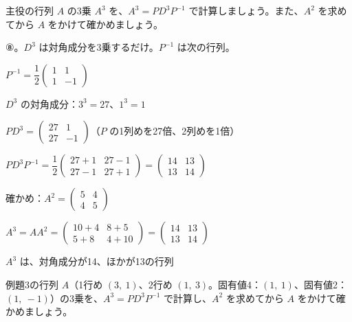 \begin{reidai}[$A^n$ を対角化で計算する]
主役の行列 $A$ の3乗 $A^3$ を、$A^3=PD^3P^{-1}$ で計算しましょう。また、$A^2$ を求めてから $A$ をかけて確かめましょう。\par
\kangaekata ⑧。$D^3$ は対角成分を3乗するだけ。$P^{-1}$ は次の行列。\par
\kviija $P^{-1}=\dfrac12\begin{pmatrix}1&1\\1&-1\end{pmatrix}$\par
\shiki\kviijs{}\zw{} $D^3$ の対角成分：$3^3=27$、$1^3=1$\par
\kviija $PD^3=\begin{pmatrix}27&1\\27&-1\end{pmatrix}$（$P$ の1列めを27倍、2列めを1倍）\par
\kviija $PD^3P^{-1}=\dfrac12\begin{pmatrix}27+1&27-1\\27-1&27+1\end{pmatrix}=\begin{pmatrix}14&13\\13&14\end{pmatrix}$\par
\kviija 確かめ：$A^2=\begin{pmatrix}5&4\\4&5\end{pmatrix}$\par
\kviija $A^3=AA^2=\begin{pmatrix}10+4&8+5\\5+8&4+10\end{pmatrix}=\begin{pmatrix}14&13\\13&14\end{pmatrix}$\par
\kotae\kviijs{}\zw{} $A^3$ は、対角成分が14、ほかが13の行列
\end{reidai}

\begin{jibun}
例題3の行列 $A$（1行め $(3,\ 1)$、2行め $(1,\ 3)$。固有値4：$(1,\ 1)$、固有値2：$(1,\ -1)$）の3乗を、$A^3=PD^3P^{-1}$ で計算し、$A^2$ を求めてから $A$ をかけて確かめましょう。
\end{jibun}

